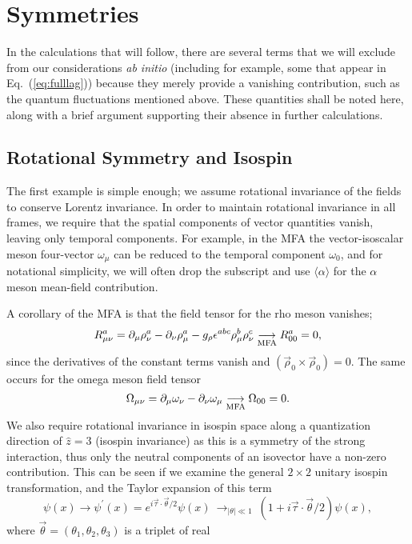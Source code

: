 \documentclass[11pt,a4paper,twoside]{carrollthesis}
\newcommand{\be}{\begin{equation}}
\newcommand{\ee}{\end{equation}}
\newcommand{\del}{\partial}
\newcommand{\bra}{\langle}
\newcommand{\ket}{\rangle}
\newcommand{\w}{\omega}
\begin{document}
\section{Symmetries}\label{sec:symmetries}
%
In the calculations that will follow, there are several terms that we
will exclude from our considerations {\it ab initio} (including for
example, some that appear in Eq.~(\ref{eq:fulllag})) because they
merely provide a vanishing contribution, such as the quantum
fluctuations mentioned above. These quantities shall be noted here,
along with a brief argument supporting their absence in further
calculations.\par
%
\subsection{Rotational Symmetry and Isospin}\label{subsec:rotational}
%
The first example is simple enough; we assume rotational invariance of
the fields to conserve Lorentz invariance. In order to maintain
rotational invariance in all frames, we require that the spatial
components of vector quantities vanish, leaving only temporal
components. For example, in the MFA the vector-isoscalar meson
four-vector $\w_\mu$ can be reduced to the temporal component $\w_0$,
and for notational simplicity, we will often drop the subscript and
use $\bra\alpha\ket$ for the $\alpha$ meson mean-field
contribution.\par
%
A corollary of the MFA is that the field tensor for the rho meson
vanishes;
%
\be R^a_{\mu\nu} = \del_\mu\rho^a_\nu - \del_\nu\rho^a_\mu - g_\rho
\epsilon^{abc}\rho^b_\mu\rho^c_\nu \underset{\rm MFA}\longrightarrow
R^a_{00} = 0, \ee
%
since the derivatives of the constant terms vanish and
$(\vec{\rho}_0\times\vec{\rho}_0) = 0$. The same occurs for the omega
meson field tensor
%
\be \Omega_{\mu\nu} = \del_\mu\omega_\nu - \del_\nu\omega_\mu
\underset{\rm MFA}\longrightarrow \Omega_{00} = 0.  \ee
%
We also require rotational invariance in isospin space along a
quantization direction of $\hat{z}=\hat{3}$ (isospin invariance) as
this is a symmetry of the strong interaction, thus only the neutral
components of an isovector have a non-zero contribution. This can be
seen if we examine the general $2\times2$ unitary isospin
transformation, and the Taylor expansion of this term
%
\be \psi(x) \to \psi^\prime(x) = e^{i\vec{\tau}\cdot \vec{\theta}/2}
\psi(x)
\ \mathop{\longrightarrow}_{|\theta| \ll 1} \ \left(1 +
i\vec{\tau}\cdot\vec{\theta}/2 \right)\psi(x), \ee
%
where $\vec{\theta}=(\theta_1,\theta_2,\theta_3)$ is a triplet of real
\end{document}
